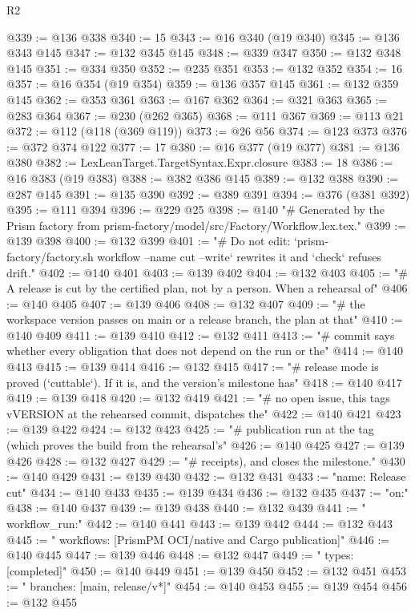 \begin{lexlean}{R2}
\begin{coremodule}
@339 := @136 @338
@340 := 15
@343 := @16 @340 (@19 @340)
@345 := @136 @343 @145
@347 := @132 @345 @145
@348 := @339 @347
@350 := @132 @348 @145
@351 := @334 @350
@352 := @235 @351
@353 := @132 @352
@354 := 16
@357 := @16 @354 (@19 @354)
@359 := @136 @357 @145
@361 := @132 @359 @145
@362 := @353 @361
@363 := @167 @362
@364 := @321 @363
@365 := @283 @364
@367 := @230 (@262 @365)
@368 := @111 @367
@369 := @113 @21
@372 := @112 (@118 (@369 @119))
@373 := @26 @56
@374 := @123 @373
@376 := @372 @374 @122
@377 := 17
@380 := @16 @377 (@19 @377)
@381 := @136 @380
@382 := LexLeanTarget.TargetSyntax.Expr.closure
@383 := 18
@386 := @16 @383 (@19 @383)
@388 := @382 @386 @145
@389 := @132 @388
@390 := @287 @145
@391 := @135 @390
@392 := @389 @391
@394 := @376 (@381 @392)
@395 := @111 @394
@396 := @229 @25
@398 := @140
    "# Generated by the Prism factory from prism-factory/model/src/Factory/Workflow.lex.tex."
@399 := @139 @398
@400 := @132 @399
@401 := "# Do not edit: `prism-factory/factory.sh workflow --name cut --write` rewrites it and `check` refuses drift."
@402 := @140 @401
@403 := @139 @402
@404 := @132 @403
@405 := "# A release is cut by the certified plan, not by a person. When a rehearsal of"
@406 := @140 @405
@407 := @139 @406
@408 := @132 @407
@409 := "# the workspace version passes on main or a release branch, the plan at that"
@410 := @140 @409
@411 := @139 @410
@412 := @132 @411
@413 := "# commit says whether every obligation that does not depend on the run or the"
@414 := @140 @413
@415 := @139 @414
@416 := @132 @415
@417 := "# release mode is proved (`cuttable`). If it is, and the version's milestone has"
@418 := @140 @417
@419 := @139 @418
@420 := @132 @419
@421 := "# no open issue, this tags vVERSION at the rehearsed commit, dispatches the"
@422 := @140 @421
@423 := @139 @422
@424 := @132 @423
@425 := "# publication run at the tag (which proves the build from the rehearsal's"
@426 := @140 @425
@427 := @139 @426
@428 := @132 @427
@429 := "# receipts), and closes the milestone."
@430 := @140 @429
@431 := @139 @430
@432 := @132 @431
@433 := "name: Release cut"
@434 := @140 @433
@435 := @139 @434
@436 := @132 @435
@437 := "on:"
@438 := @140 @437
@439 := @139 @438
@440 := @132 @439
@441 := "  workflow_run:"
@442 := @140 @441
@443 := @139 @442
@444 := @132 @443
@445 := "    workflows: [PrismPM OCI/native and Cargo publication]"
@446 := @140 @445
@447 := @139 @446
@448 := @132 @447
@449 := "    types: [completed]"
@450 := @140 @449
@451 := @139 @450
@452 := @132 @451
@453 := "    branches: [main, release/v*]"
@454 := @140 @453
@455 := @139 @454
@456 := @132 @455

\end{coremodule}
\end{lexlean}
